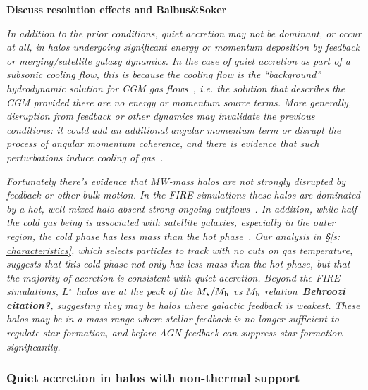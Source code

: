 \documentclass[fleqn,usenatbib]{mnras}
\begin{document}
\textbf{Discuss resolution effects and Balbus\&Soker}

\textit{
In addition to the prior conditions, quiet accretion may not be dominant, or occur at all, in halos undergoing significant energy or momentum deposition by feedback or merging/satellite galaxy dynamics.
In the case of quiet accretion as part of a subsonic cooling flow, this is because the cooling flow is the ``background'' hydrodynamic solution for CGM gas flows~\cite{Stern2019}, i.e. the solution that describes the CGM provided there are no energy or momentum source terms.
More generally, disruption from feedback or other dynamics may invalidate the previous conditions: it could add an additional angular momentum term or disrupt the process of angular momentum coherence, and there is evidence that such perturbations induce cooling of gas~\citep[e.g.][]{Hummels2019, Esmerian2020}.
}

\textit{
Fortunately there's evidence that MW-mass halos are not strongly disrupted by feedback or other bulk motion.
In the FIRE simulations these halos are dominated by a hot, well-mixed halo absent strong ongoing outflows~\citep{Hafen2019}.
In addition, while half the cold gas being is associated with satellite galaxies, especially in the outer region, the cold phase has less mass than the hot phase~\citep{Hafen2020}.
Our analysis in \S\ref{s: characteristics}, which selects particles to track with no cuts on gas temperature, suggests that this cold phase not only has less mass than the hot phase, but that the majority of accretion is consistent with quiet accretion.
Beyond the FIRE simulations, $L^\star$ halos are at the peak of the $M_\star/M_{\rm h}$ vs $M_{\rm h}$ relation~\textbf{Behroozi citation?}, suggesting they may be halos where galactic feedback is weakest.
These halos may be in a mass range where stellar feedback is no longer sufficient to regulate star formation, and before AGN feedback can suppress star formation significantly.
}

\subsubsection{Quiet accretion in halos with non-thermal support}
\end{document}
